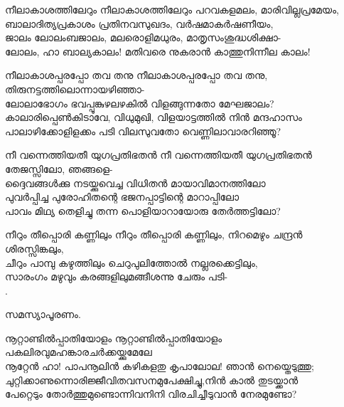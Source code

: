 \begin{enumerate}

\begin{slokam}{\VSr}{\KJ}{നീലാകാശത്തിലേറും}
നീലാകാശത്തിലേറും പറവകളമലം, മാരിവില്ലപ്രമേയം,\\
ബാലാദിത്യപ്രകാശം പ്രതിനവസുഖദം, വർഷമാകർഷണീയം,\\
ജാലം ലോലംബജാലം, മലരൊളിമധുരം, മാതൃസംശുദ്ധശിക്ഷാ-\\
ലോലം, ഹാ ബാല്യകാലം! മതിവരെ നുകരാൻ കാത്തുനിന്നീല കാലം!
\end{slokam}



\begin{slokam}{\VSr}{\Unk}{നീലാകാശപ്പരപ്പോ തവ തനു}
നീലാകാശപ്പരപ്പോ തവ തനു, തിരുനട്ടത്തിലൊന്നായഴിഞ്ഞാ-\\
ലോലാഭോഗം ഭവപ്പൂങ്കുഴലഴകിൽ വിളങ്ങുന്നതോ മേഘജാലം?\\
കാലാരിപ്പെൺകിടാവേ, വിധുമുഖി, വിളയാട്ടത്തിൽ നിൻ മന്ദഹാസം\\
പാലാഴിക്കോളിളക്കം പടി വിലസുവതോ വെണ്ണിലാവാരറിഞ്ഞൂ?
\end{slokam}



\begin{slokam}{\VSv}{\VRV}{നീ വന്നെത്തിയതീ യുഗപ്രതിഭതൻ}
നീ വന്നെത്തിയതീ യുഗപ്രതിഭതൻ തേജസ്സിലോ, ഞങ്ങളെ-\\
ദ്ദൈവങ്ങള്‍ക്കു നടയ്ക്കുവെച്ച വിധിതൻ മായാവിമാനത്തിലോ\\
പുവർപ്പിച്ച പുരോഹിതന്റെ ഭജനപ്പാട്ടിന്റെ മാറാപ്പിലോ\\
പാവം മിഥ്യ തെളിച്ചു തന്ന പൊളിയാറായോരു തേർത്തട്ടിലോ?
\end{slokam}




\begin{slokam}{\VSv}{\Unk}{നീറും തീപ്പൊരി കണ്ണിലും}
നീറും തീപ്പൊരി കണ്ണിലും, നിറമെഴും ചന്ദ്രൻ ശിരസ്സിങ്കലും,\\
ചീറും പാമ്പു കഴുത്തിലും ചെറുപുലിത്തോൽ നല്ലരക്കെട്ടിലും,\\
സാരംഗം മഴുവും കരങ്ങളിലുമങ്ങീശന്നു ചേരും പടി-\\
.
\end{slokam}



സമസ്യാപൂരണം. 


\begin{slokam}{\VSr}{\VKG}{നൂറ്റാണ്ടിൽപ്പാതിയോളം}
നൂറ്റാണ്ടിൽപ്പാതിയോളം പകലിരവുമഹങ്കാരചർക്കയ്ക്കുമേലേ\\
നൂറ്റേൻ ഹാ! പാപനൂലിൻ കഴികളതു കൃപാലോല! ഞാൻ നെയ്തെടുത്തു;\\
ചുറ്റിക്കാണുന്നൊരിജ്ജീവിതവസനമുപേക്ഷിച്ചു,നിൻ കാൽ തുടയ്ക്കാൻ\\
പേറ്റെടും തോർത്തുമുണ്ടൊന്നിവനിനി വിരചിച്ചീടുവാൻ നേരമുണ്ടോ?
\end{slokam}


\end{enumerate}
